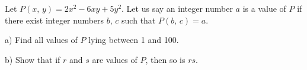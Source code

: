 Let $P(x,\, y)=2x^{2}-6xy+5y^{2}$. Let us say an integer number $a$ is a value of $P$ if there exist integer numbers $b$,  $c$ such that $P(b,\, c)=a$.

a) Find all values of $P$ lying between 1 and 100.

b) Show that if $r$ and $s$ are values of $P$,  then so is $rs$.
